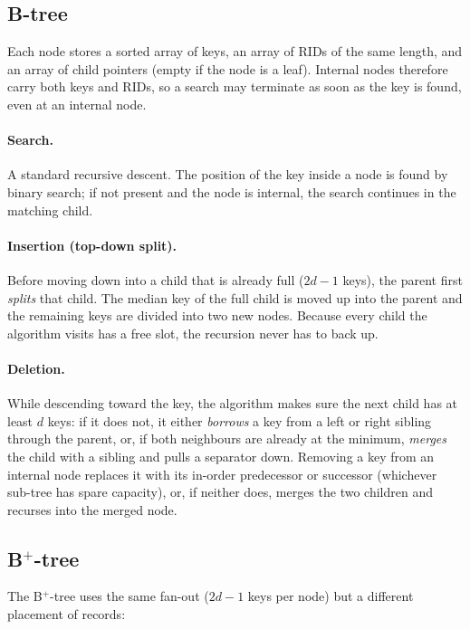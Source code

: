 \documentclass[sigconf]{acmart}
\begin{document}
\subsection{B-tree}

Each node stores a sorted array of keys, an array of RIDs of the same
length, and an array of child pointers (empty if the node is a leaf).
Internal nodes therefore carry both keys and RIDs, so a search may
terminate as soon as the key is found, even at an internal node.

\paragraph{Search.} A standard recursive descent. The position of the
key inside a node is found by binary search; if not present and the
node is internal, the search continues in the matching child.

\paragraph{Insertion (top-down split).} Before moving down
into a child that is already full ($2d-1$ keys), the parent first
\emph{splits} that child. The median key of the full child is moved up
into the parent and the remaining keys are divided into two new nodes.
Because every child the algorithm visits has a free slot, the
recursion never has to back up.

\paragraph{Deletion.} While descending toward the key, the
algorithm makes sure the next child has at least $d$ keys: if it
does not, it either \emph{borrows} a key from a left or right
sibling through the parent, or, if both neighbours are already at
the minimum, \emph{merges} the child with a sibling and pulls a
separator down. Removing a key from an internal node replaces it
with its in-order predecessor or successor (whichever sub-tree has
spare capacity), or, if neither does, merges the two children and
recurses into the merged node.

\subsection{B$^+$-tree}

The B$^+$-tree uses the same fan-out ($2d-1$ keys per node) but a
different placement of records:
\end{document}
